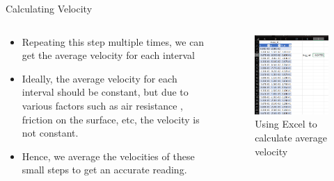 \documentclass{beamer}
\begin{document}
\begin{frame}{Calculating Velocity}
\begin{columns}
\begin{column}{0.5\textwidth}
	\begin{autotext}
   \begin{itemize}
	\item Repeating this step multiple times, we can get the average
		velocity for each interval
	\item Ideally, the average velocity for each interval should be 
		constant, but due to various factors such as air resistance
		, friction on the surface, etc, the velocity is not constant. 
	\item Hence, we average the velocities of these small steps to get an 
	accurate reading.
	\end{itemize}
	\end{autotext}
\end{column}
\begin{column}{0.5\textwidth}
	\begin{figure}
	\centering
	    \includegraphics[height=0.6\textheight]{res/excelValueSS}
	    \caption{Using Excel to calculate average velocity}
	    \label{fig:trackerSS}
	\end{figure}
\end{column}
\end{columns}
\end{frame}
\end{document}
